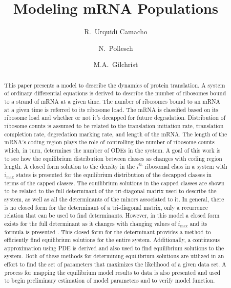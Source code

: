 \documentclass[review]{elsarticle}
\newcommand{\imax}{\ensuremath{{i_{\max}}}\xspace}
\begin{document}
\title{Modeling mRNA Populations}
\author[utkgst]{R.~Urquidi Camacho}
\author[utkm,curradd]{N.~Pollesch}
\author[utkgst,utkeeb,nimbios,cor1]{M.A.~Gilchrist}
\address[utkgst]{Genome Science and Technology Program, University of Tennessee, Knoxville, TN 37996-XXX}
\address[utkm]{Department of Mathematics, University of Tennessee,  Knoxville, TN 37996-1320}
\address[utkeeb]{Department of Ecology and Evolutionary Biology, University of Tennessee, Knoxville, TN 37996-1610}
\address[nimbios]{National Institute for Mathematical and Biological Synthesis, University of Tennessee, Knoxville, TN 37996-3410}

\begin{abstract}
This paper presents a model to describe the dynamics of protein translation.  
A system of ordinary differential equations is derived to describe the number of ribosomes bound to a strand of mRNA at a given time.
The number of ribosomes bound to an mRNA at a given time is referred to its ribosome load.
The mRNA is classified based on its ribosome load and whether or not it's decapped for future degradation.  
Distribution of ribosome counts is assumed to be related to the translation initiation rate, translation completion rate, degredation marking rate, and length of the mRNA.
The length of the mRNA's coding region plays the role of controlling the number of ribosome counts which, in turn, determines the number of ODEs in the system.  
A goal of this work is to see how the equilibrium distribution between classes as changes with coding region length.
A closed form solution to the density in the $i^{th}$ ribosomal class in a system with \imax states is presented for the equilibrium distribution of the decapped classes in terms of the capped classes.
The equilibrium solutions in the capped classes are shown to be related to the full determinant of the tri-diagonal matrix used to describe the system, as well as all the determinants of the minors associated to it.
In general, there is no closed form for the determinant of a tri-diagonal matrix, only a recurrence relation that can be used to find determinants.
However, in this model a closed form exists for the full determinant as it changes with changing values of \imax and its formula is presented .
This closed form for the determinant provides a method to efficiently find equilibrium solutions for the entire system.
Additionally, a continuous approximation using PDE is derived and also used to find equilibrium solutions to the system.
Both of these methods for determining equilibrium solutions are utilized in an effort to find the set of parameters that maximizes the likelihood of a given data set.
A process for mapping the equilibrium model results to data is also presented and used to begin preliminary estimation of model parameters and to verify model function.
 

\end{abstract}
\end{document}
